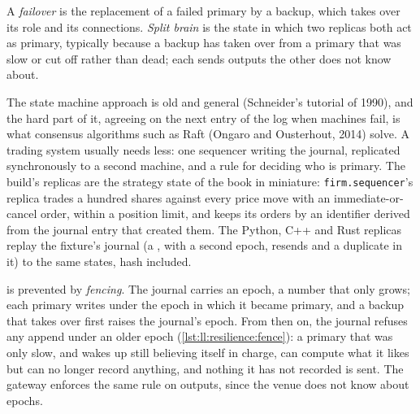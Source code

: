 \begin{definition}\label{def:ll:resilience:failover}
A \emph{failover} is the replacement of a failed primary by a backup, which takes over its role and its
connections. \emph{Split brain} is the state in which two replicas both act as primary, typically because a
backup has taken over from a primary that was slow or cut off rather than dead; each sends outputs the other does not know
about.
\end{definition}

The state machine approach is old and general (Schneider's tutorial of 1990), and the hard part of it, agreeing on the next
entry of the log when machines fail, is what consensus algorithms such as Raft (Ongaro and Ousterhout, 2014) solve. A trading
system usually needs less: one sequencer writing the journal, replicated synchronously to a second machine, and a rule for
deciding who is primary. The build's replicas are the strategy state of the book in miniature: \texttt{firm.sequencer}'s
replica trades a hundred shares against every price move with an immediate-or-cancel order, within a position limit, and keeps
its orders by an identifier derived from the journal entry that created them. The Python, C++ and Rust replicas replay the
fixture's journal (a , with a second epoch, resends and a duplicate in it) to the same states, hash included.

 is prevented by \emph{fencing}. The journal carries an epoch, a number that only grows; each primary writes under
the epoch in which it became primary, and a backup that takes over first raises the journal's epoch. From then on, the journal
refuses any append under an older epoch (\cref{lst:ll:resilience:fence}): a primary that was only slow, and wakes up still
believing itself in charge, can compute what it likes but can no longer record anything, and nothing it has not recorded is
sent. The gateway enforces the same rule on outputs, since the venue does not know about epochs.

\label{lst:ll:resilience:fence}

